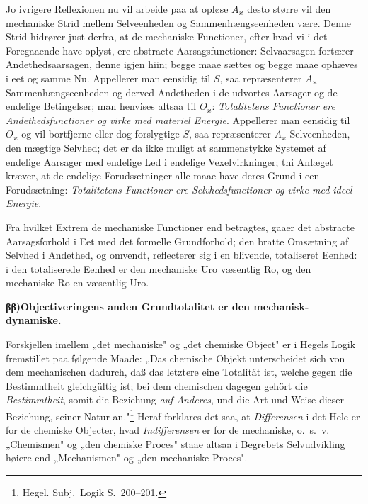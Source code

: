 \documentclass[12pt]{book}
\newcommand{\opage}[1]{\marginnote{\footnotesize\textit{[#1]}}}
\begin{document}
Jo ivrigere Reflexionen nu vil arbeide paa at opløse $A_{\varkappa}$ desto større vil den mechaniske
Strid mellem Selveenheden og Sammenhængseenheden være. Denne Strid hidrører just derfra, at de
mechaniske Functioner, efter hvad vi i det Foregaaende have oplyst, ere abstracte Aarsagsfunctioner:
Selvaarsagen fortærer Andethedsaarsagen, denne igjen hiin; begge maae sættes og begge maae ophæves i
eet og samme Nu. Appellerer man eensidig til $S$, saa repræsenterer $A_{\varkappa}$
Sammenhængseenheden og derved Andetheden i de udvortes Aarsager og de endelige Betingelser; man
henvises altsaa til $O_{\varkappa}$: \emph{Totalitetens Functioner ere Andethedsfunctioner og virke
med materiel Energie}. Appellerer man eensidig til $O_{\varkappa}$ og vil bortfjerne eller dog
forslygtige $S$, saa repræsenterer $A_{\varkappa}$ Selveenheden, den mægtige Selvhed; det er da ikke
muligt at sammenstykke Systemet af endelige Aarsager med endelige Led i endelige Vexelvirkninger; thi
\opage{437} Anlæget kræver, at de endelige Forudsætninger alle maae have deres Grund i een Forudsætning:
\emph{Totalitetens Functioner ere Selvhedsfunctioner og virke med ideel Energie}.

Fra hvilket Extrem de mechaniske Functioner end betragtes, gaaer det abstracte Aarsagsforhold i Eet
med det formelle Grundforhold; den bratte Omsætning af Selvhed i Andethed, og omvendt, reflecterer sig
i en blivende, totaliseret Eenhed: i den totaliserede Eenhed er den mechaniske Uro væsentlig Ro, og
den mechaniske Ro en væsentlig Uro.

\begin{center}{\bfseries ββ)\quad Objectiveringens anden Grundtotalitet er den mechanisk-dynamiske.}\end{center}

Forskjellen imellem „det mechaniske" og „det chemiske Object" er i Hegels Logik fremstillet paa
følgende Maade: „Das chemische Objekt unterscheidet sich von dem mechanischen dadurch, daß das
letztere eine Totalität ist, welche gegen die Bestimmtheit gleichgültig ist; bei dem chemischen
dagegen gehört die \emph{Bestimmtheit}, somit die Beziehung \emph{auf Anderes}, und die Art und Weise
dieser Beziehung, seiner Natur an."\footnote{Hegel. Subj.\ Logik S.~200--201.} Heraf forklares det
saa, at \emph{Differensen} i det Hele er for de chemiske Objecter, hvad \emph{Indifferensen} er for de
mechaniske, o.\ s.\ v. „Chemismen" og „den chemiske Proces" staae altsaa i Begrebets Selvudvikling
høiere end „Mechanismen" og „den mechaniske Proces".
\end{document}
